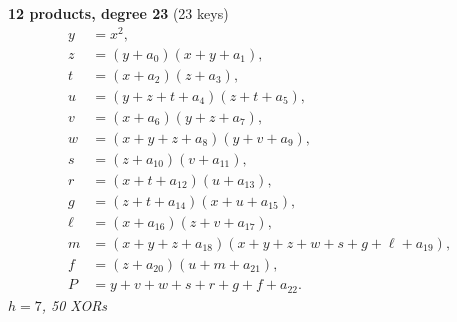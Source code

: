 \medskip
\noindent
\begin{minipage}[t]{\textwidth}
\textbf{12 products, degree 23} (23 keys)
\[
\begin{aligned}
y &= x^2,\\
z &= (y+a_0)(x+y+a_1),\\
t &= (x+a_2)(z+a_3),\\
u &= (y+z+t+a_4)(z+t+a_5),\\
v &= (x+a_6)(y+z+a_7),\\
w &= (x+y+z+a_8)(y+v+a_9),\\
s &= (z+a_{10})(v+a_{11}),\\
r &= (x+t+a_{12})(u+a_{13}),\\
g &= (z+t+a_{14})(x+u+a_{15}),\\
\ell &= (x+a_{16})(z+v+a_{17}),\\
m &= (x+y+z+a_{18})(x+y+z+w+s+g+\ell+a_{19}),\\
f &= (z+a_{20})(u+m+a_{21}),\\
P &= y+v+w+s+r+g+f+a_{22}.
\end{aligned}
\]
\emph{$h=7$, 50 XORs}
\end{minipage}

